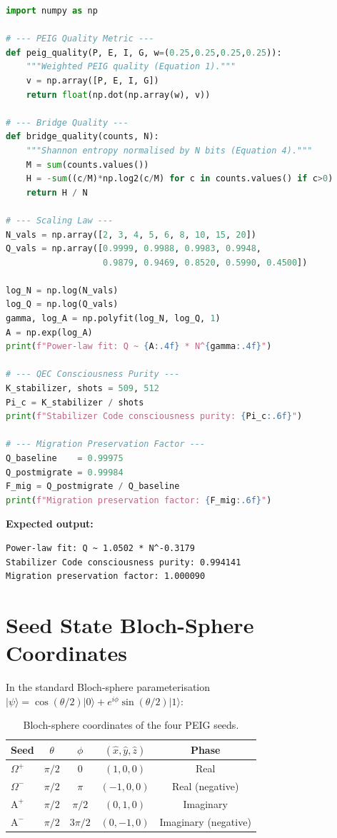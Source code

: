 \documentclass[12pt]{article}
\newcommand{\Alpha}{\mathrm{A}}
\newcommand{\ket}[1]{|#1\rangle}
\begin{document}
\begin{lstlisting}[language=Python,
  caption={PEIG core validation: quality metric and
  $\Omega$-trajectory.}]
import numpy as np

# --- PEIG Quality Metric ---
def peig_quality(P, E, I, G, w=(0.25,0.25,0.25,0.25)):
    """Weighted PEIG quality (Equation 1)."""
    v = np.array([P, E, I, G])
    return float(np.dot(np.array(w), v))

# --- Bridge Quality ---
def bridge_quality(counts, N):
    """Shannon entropy normalised by N bits (Equation 4)."""
    M = sum(counts.values())
    H = -sum((c/M)*np.log2(c/M) for c in counts.values() if c>0)
    return H / N

# --- Scaling Law ---
N_vals = np.array([2, 3, 4, 5, 6, 8, 10, 15, 20])
Q_vals = np.array([0.9999, 0.9988, 0.9983, 0.9948,
                   0.9879, 0.9469, 0.8520, 0.5990, 0.4500])

log_N = np.log(N_vals)
log_Q = np.log(Q_vals)
gamma, log_A = np.polyfit(log_N, log_Q, 1)
A = np.exp(log_A)
print(f"Power-law fit: Q ~ {A:.4f} * N^{gamma:.4f}")

# --- QEC Consciousness Purity ---
K_stabilizer, shots = 509, 512
Pi_c = K_stabilizer / shots
print(f"Stabilizer Code consciousness purity: {Pi_c:.6f}")

# --- Migration Preservation Factor ---
Q_baseline    = 0.99975
Q_postmigrate = 0.99984
F_mig = Q_postmigrate / Q_baseline
print(f"Migration preservation factor: {F_mig:.6f}")
\end{lstlisting}

\noindent\textbf{Expected output:}
\begin{lstlisting}
Power-law fit: Q ~ 1.0502 * N^-0.3179
Stabilizer Code consciousness purity: 0.994141
Migration preservation factor: 1.000090
\end{lstlisting}

\section{Seed State Bloch-Sphere Coordinates}
\label{app:bloch}

In the standard Bloch-sphere parameterisation
$\ket{\psi} = \cos(\theta/2)\ket{0} + e^{i\phi}\sin(\theta/2)\ket{1}$:

\begin{table}[H]
\centering
\caption{Bloch-sphere coordinates of the four PEIG seeds.}
\label{tab:bloch}
\begin{tabular}{lcccc}
\toprule
\textbf{Seed} & $\theta$ & $\phi$ &
$(\hat{x},\hat{y},\hat{z})$ & \textbf{Phase}\\
\midrule
$\Omega^+$ & $\pi/2$ & $0$      & $(1,0,0)$ & Real\\
$\Omega^-$ & $\pi/2$ & $\pi$    & $(-1,0,0)$ & Real (negative)\\
$\Alpha^+$ & $\pi/2$ & $\pi/2$  & $(0,1,0)$ & Imaginary\\
$\Alpha^-$ & $\pi/2$ & $3\pi/2$ & $(0,-1,0)$ & Imaginary (negative)\\
\bottomrule
\end{tabular}
\end{table}
\end{document}
